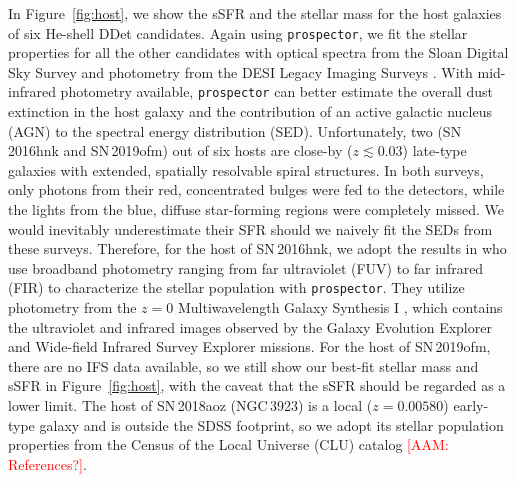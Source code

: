 \documentclass[twocolumn]{aastex631}
\newcommand{\adam}[1]{\textcolor{red}{[AAM: #1]}}
\begin{document}
{In Figure~\ref{fig:host}, we show the sSFR and the stellar mass for the host galaxies of six He-shell DDet candidates. Again using \texttt{prospector}, we fit the stellar properties for all the other candidates with optical spectra from the Sloan Digital Sky Survey \citep[SDSS;][]{York_2000} and photometry from the DESI Legacy Imaging Surveys \citep[][{\it g, r, z, $W_1$, $W_2$, $W_3$, $W_4$} magnitudes]{Dey_2019}. With mid-infrared photometry available, \texttt{prospector} can better estimate the overall dust extinction in the host galaxy and the contribution of an active galactic nucleus (AGN) to the spectral energy distribution (SED). Unfortunately, two (SN\,2016hnk and SN\,2019ofm) out of six hosts are close-by ($z\lesssim 0.03$) late-type galaxies with extended, spatially resolvable spiral structures. In both surveys, only photons from their red, concentrated bulges were fed to the detectors, while the lights from the blue, diffuse star-forming regions were completely missed. We would inevitably underestimate their SFR should we naively fit the SEDs from these surveys. Therefore, for the host of SN\,2016hnk, 
we adopt the results in \citet{Dong_Ca-rich_2022} who use broadband photometry ranging from far ultraviolet (FUV) to far infrared (FIR) to characterize the stellar population with \texttt{prospector}. They utilize photometry from the $z=0$ Multiwavelength Galaxy Synthesis I \citep[z0MGS;][]{Leroy_2019}, which contains the ultraviolet and infrared images observed by the Galaxy Evolution Explorer \citep[GALEX;][]{GALEX_2005} and Wide-field Infrared Survey Explorer \citep[WISE;][]{WISE_2010} missions.
For the host of SN\,2019ofm, there are no IFS data available, so we still show our best-fit stellar mass and sSFR in Figure~\ref{fig:host}, with the caveat that the sSFR should be regarded as a lower limit. The host of SN\,2018aoz (NGC\,3923) is a local ($z=0.00580$) early-type galaxy and is outside the SDSS footprint, so we adopt its stellar population properties from the Census of the Local Universe (CLU) catalog \adam{References?}.

}
\end{document}
